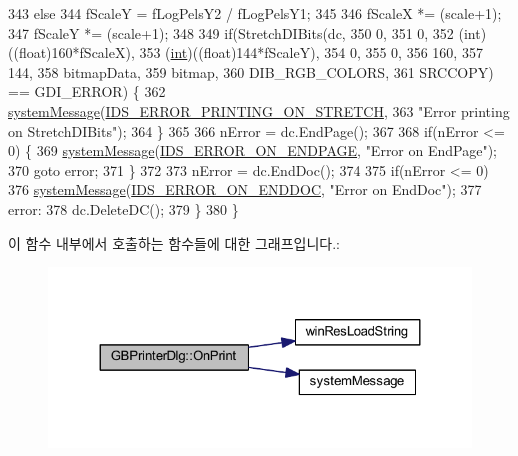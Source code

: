 \begin{DoxyCode}
343     \textcolor{keywordflow}{else}
344       fScaleY = fLogPelsY2 / fLogPelsY1;
345 
346     fScaleX *= (scale+1);
347     fScaleY *= (scale+1);
348     
349     \textcolor{keywordflow}{if}(StretchDIBits(dc,
350                      0,
351                      0,
352                      (\textcolor{keywordtype}{int})((float)160*fScaleX),
353                      (\mbox{\hyperlink{_util_8cpp_a0ef32aa8672df19503a49fab2d0c8071}{int}})((\textcolor{keywordtype}{float})144*fScaleY),
354                      0,
355                      0,
356                      160,
357                      144,
358                      bitmapData,
359                      bitmap,
360                      DIB\_RGB\_COLORS,
361                      SRCCOPY) == GDI\_ERROR) \{
362       \mbox{\hyperlink{system_8cpp_a747a9cb8e015a3d45cca636b5bd0fc69}{systemMessage}}(\mbox{\hyperlink{resource_8h_ac6cfa98309ee062098745c750a388bf2}{IDS\_ERROR\_PRINTING\_ON\_STRETCH}},
363                     \textcolor{stringliteral}{"Error printing on StretchDIBits"});
364     \}
365 
366     nError = dc.EndPage();
367 
368     \textcolor{keywordflow}{if}(nError <= 0) \{
369       \mbox{\hyperlink{system_8cpp_a747a9cb8e015a3d45cca636b5bd0fc69}{systemMessage}}(\mbox{\hyperlink{resource_8h_a0de324ba7694a3f804b5026a12ba55e7}{IDS\_ERROR\_ON\_ENDPAGE}}, \textcolor{stringliteral}{"Error on EndPage"});
370       \textcolor{keywordflow}{goto} error;
371     \}
372 
373     nError = dc.EndDoc();
374 
375     \textcolor{keywordflow}{if}(nError <= 0)
376       \mbox{\hyperlink{system_8cpp_a747a9cb8e015a3d45cca636b5bd0fc69}{systemMessage}}(\mbox{\hyperlink{resource_8h_ac13ee78fb1fe46b2cc09353bf5dd6e1b}{IDS\_ERROR\_ON\_ENDDOC}}, \textcolor{stringliteral}{"Error on EndDoc"});
377   error:
378     dc.DeleteDC();
379   \}
380 \}
\end{DoxyCode}
이 함수 내부에서 호출하는 함수들에 대한 그래프입니다.\+:
\nopagebreak
\begin{figure}[H]
\begin{center}
\leavevmode
\includegraphics[width=324pt]{class_g_b_printer_dlg_ac778254287374af1e218e778bdde4f26_cgraph}
\end{center}
\end{figure}
\mbox{\label{class_g_b_printer_dlg_a3cfa1c22a60df868b53c9e9d52094963}} 
